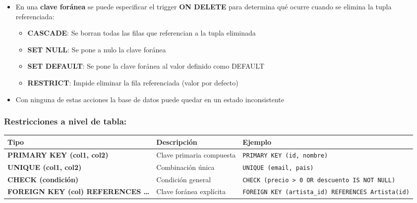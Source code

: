 \documentclass[
]{book}
\newcounter{none} %
\providecommand{\tightlist}{%
  \setlength{\itemsep}{0pt}\setlength{\parskip}{0pt}}
\theoremstyle{break}
\theoremstyle{nonumberplain}
\begin{document}
\begin{itemize}
\tightlist
\item
  En una \textbf{clave foránea} se puede especificar el trigger \textbf{ON DELETE} para determina qué ocurre cuando se elimina la tupla referenciada:

  \begin{itemize}
  \tightlist
  \item
    \textbf{CASCADE}: Se borran todas las filas que referencian a la tupla eliminada
  \item
    \textbf{SET NULL}: Se pone a nulo la clave foránea
  \item
    \textbf{SET DEFAULT}: Se pone la clave foránea al valor definido como DEFAULT
  \item
    \textbf{RESTRICT}: Impide eliminar la fila referenciada (valor por defecto)
  \end{itemize}
\item
  Con ninguna de estas acciones la base de datos puede quedar en un estado inconsistente
\end{itemize}

\subsubsection{Restricciones a nivel de tabla:}\label{restricciones-a-nivel-de-tabla}

{\def\LTcaptype{none} %
\begin{longtable}[]{@{}
  >{\raggedright\arraybackslash}p{}
  >{\raggedright\arraybackslash}p{}
  >{\raggedright\arraybackslash}p{}@{}}
\toprule\noalign{}
\begin{minipage}[b]{\linewidth}\raggedright
Tipo
\end{minipage} & \begin{minipage}[b]{\linewidth}\raggedright
Descripción
\end{minipage} & \begin{minipage}[b]{\linewidth}\raggedright
Ejemplo
\end{minipage} \\
\midrule\noalign{}
\endhead
\bottomrule\noalign{}
\endlastfoot
\textbf{PRIMARY KEY (col1, col2)} & Clave primaria compuesta & \texttt{PRIMARY\ KEY\ (id,\ nombre)} \\
\textbf{UNIQUE (col1, col2)} & Combinación única & \texttt{UNIQUE\ (email,\ pais)} \\
\textbf{CHECK (condición)} & Condición general & \texttt{CHECK\ (precio\ \textgreater{}\ 0\ OR\ descuento\ IS\ NOT\ NULL)} \\
\textbf{FOREIGN KEY (col) REFERENCES \ldots{}} & Clave foránea explícita & \texttt{FOREIGN\ KEY\ (artista\_id)\ REFERENCES\ Artista(id)} \\
\end{longtable}
}
\end{document}
